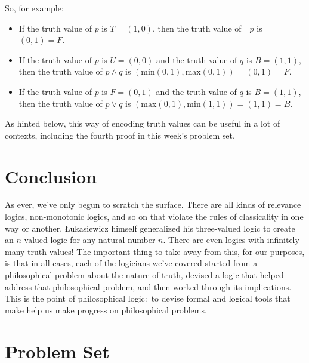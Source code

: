 \documentclass[11pt]{article}
\theoremstyle{definition}
\theoremstyle{remark}
\begin{document}
So, for example:
\begin{itemize}
    \item If the truth value of $p$ is $T=(1,0)$, then the truth value of $\neg p$ is $(0,1)=F$.

    \item If the truth value of $p$ is $U=(0,0)$ and the truth value of $q$ is $B=(1,1)$, then the truth value of $p\wedge q$ is $(\text{min}(0,1),\text{max}(0,1))=(0,1)=F$.

    \item If the truth value of $p$ is $F=(0,1)$ and the truth value of $q$ is $B=(1,1)$, then the truth value of $p\vee q$ is $(\text{max}(0,1),\text{min}(1,1))=(1,1)=B$.
\end{itemize}
As hinted below, this way of encoding truth values can be useful in a lot of contexts, including the fourth proof in this week's problem set.\par 



\section{Conclusion}
As ever, we've only begun to scratch the surface. There are all kinds of relevance logics, non-monotonic logics, and so on that violate the rules of classicality in one way or another. Łukasiewicz himself generalized his three-valued logic to create an $n$-valued logic for any natural number $n$. There are even logics with infinitely many truth values! The important thing to take away from this, for our purposes, is that in all cases, each of the logicians we've covered started from a philosophical problem about the nature of truth, devised a logic that helped address that philosophical problem, and then worked through its implications. This is the point of philosophical logic:\ to devise formal and logical tools that make help us make progress on philosophical problems. 

\section*{Problem Set}
\end{document}

